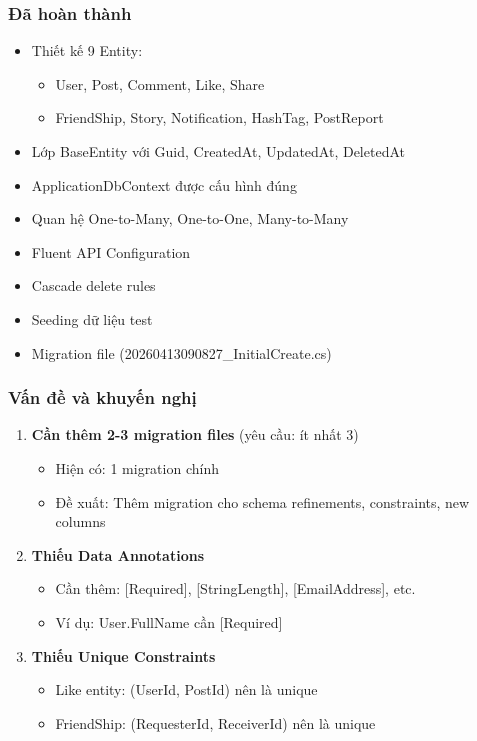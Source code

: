 \documentclass[12pt,a4paper]{report}
\begin{document}
\subsubsection{Đã hoàn thành}
\begin{itemize}
    \item[$\checkmark$] Thiết kế 9 Entity:
    \begin{itemize}
        \item User, Post, Comment, Like, Share
        \item FriendShip, Story, Notification, HashTag, PostReport
    \end{itemize}
    \item[$\checkmark$] Lớp BaseEntity với Guid, CreatedAt, UpdatedAt, DeletedAt
    \item[$\checkmark$] ApplicationDbContext được cấu hình đúng
    \item[$\checkmark$] Quan hệ One-to-Many, One-to-One, Many-to-Many
    \item[$\checkmark$] Fluent API Configuration
    \item[$\checkmark$] Cascade delete rules
    \item[$\checkmark$] Seeding dữ liệu test
    \item[$\checkmark$] Migration file (20260413090827\_InitialCreate.cs)
\end{itemize}

\subsubsection{Vấn đề và khuyến nghị}
\begin{enumerate}
    \item \textbf{Cần thêm 2-3 migration files} (yêu cầu: ít nhất 3)
    \begin{itemize}
        \item Hiện có: 1 migration chính
        \item Đề xuất: Thêm migration cho schema refinements, constraints, new columns
    \end{itemize}
    
    \item \textbf{Thiếu Data Annotations}
    \begin{itemize}
        \item Cần thêm: [Required], [StringLength], [EmailAddress], etc.
        \item Ví dụ: User.FullName cần [Required]
    \end{itemize}
    
    \item \textbf{Thiếu Unique Constraints}
    \begin{itemize}
        \item Like entity: (UserId, PostId) nên là unique
        \item FriendShip: (RequesterId, ReceiverId) nên là unique
    \end{itemize}
\end{enumerate}
\end{document}
